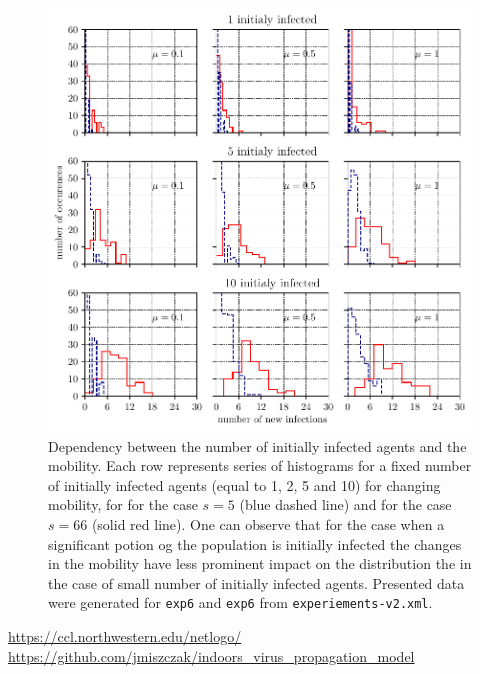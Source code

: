 \documentclass[10pt,a4paper]{article}
\begin{document}
\begin{figure}[ht!]
\begin{center}
\includegraphics[scale=0.75]{plots/plot_pop100_world-1_exp6_exp7_hist.pdf}
\end{center}
\caption{Dependency between the number of initially infected agents and the mobility. Each row represents series of histograms for a fixed number of initially infected agents (equal to 1, 2, 5 and 10) for changing mobility, for for the case $s=5$ (blue dashed line) and for the case $s=66$ (solid red line). One can observe that for the case when a significant potion og the population is initially infected the changes in the mobility have less prominent impact on the distribution the in the case of small number of initially infected agents. Presented data were generated for \texttt{exp6} and \texttt{exp6} from  \texttt{experiements-v2.xml}.}
\label{fig:exp6_pop100_world-1_hist}
\end{figure}

\begin{thebibliography}{1}
	 \url{https://ccl.northwestern.edu/netlogo/}
	 \url{https://github.com/jmiszczak/indoors_virus_propagation_model}
\end{thebibliography}
\end{document}
